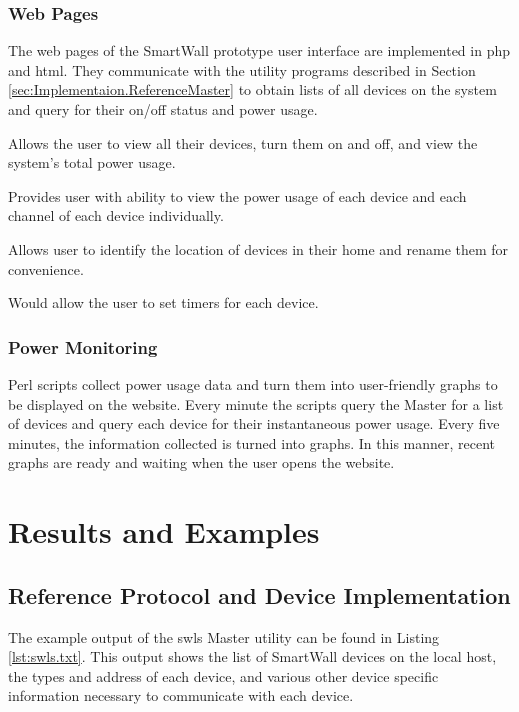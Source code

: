 \documentclass[12pt]{article}
\begin{document}
\subsubsection{Web Pages}
The web pages of the SmartWall prototype user interface are
implemented in php and html. They communicate with the utility
programs described in Section \ref{sec:Implementaion.ReferenceMaster}
to obtain lists of all devices on
the system and query for their on/off status and power usage.
\begin{description}
  \setlength{\itemsep}{0pt}
  \setlength{\parskip}{0pt}
  \setlength{\parsep}{0pt}
\item[Home Page:] Allows the user to view all their devices, turn them on and
off, and view the system’s total power usage.
\item[Energy Usage:] Provides user with ability to view the power usage
of each device and each channel of each device individually.
\item[Setup Page:] Allows user to identify the location of devices in their
home and rename them for convenience.
\item[Timers Page:] Would allow the user to set timers for each device.
\end{description}

\subsubsection{Power Monitoring}
Perl scripts collect power usage data and turn them into user-friendly
graphs to be displayed on the website. Every minute the scripts query
the Master for a list of devices and query each device for their
instantaneous power usage. Every five minutes, the information
collected is turned into graphs. In this manner, recent graphs are
ready and waiting when the user opens the website.

\section{Results and Examples}
\subsection{Reference Protocol and Device Implementation}

The example output of the swls Master utility can be found in Listing
\ref{lst:swls.txt}. This output shows the list of SmartWall devices on
the local host, the types and address of each device, and various
other device specific information necessary to communicate with each device.
\end{document}
